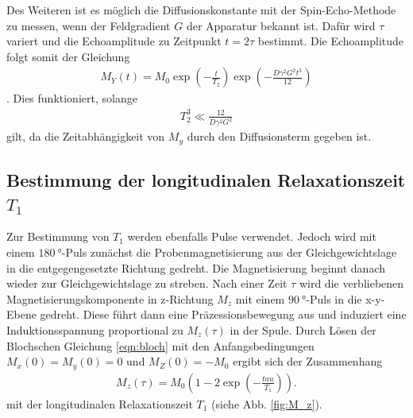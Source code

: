 Des Weiteren ist es möglich die
Diffusionskonstante mit der Spin-Echo-Methode
zu messen, wenn der Feldgradient $G$ der Apparatur bekannt ist.
Dafür wird $\tau$ variert und die Echoamplitude zu Zeitpunkt $t=2\tau$ bestimmt.
Die Echoamplitude folgt somit der Gleichung
\begin{align}
M_Y(t) = M_0\exp\left(-\frac{t}{T_2}\right)
\exp\left(-\frac{D\gamma^2 G^2 t^3}{12}\right) \label{eqn:32}
\end{align}.
Dies funktioniert, solange
\begin{align}
  T_2^3 \ll \frac{12}{D\gamma^2 G^2}
\end{align}
gilt, da die Zeitabhängigkeit von $M_y$ durch den Diffusionsterm gegeben ist.

\subsection{Bestimmung der longitudinalen Relaxationszeit $T_1$}
\label{subsec:t1}
Zur Bestimmung von $T_1$ werden ebenfalls Pulse verwendet.
Jedoch wird mit einem $\SI{180}{\degree}$-Puls zunächst die Probenmagnetisierung
aus der Gleichgewichtslage in die entgegengesetzte
Richtung gedreht. Die Magnetisierung beginnt danach
wieder zur Gleichgewichtslage zu streben.
Nach einer Zeit $\tau$ wird
die verbliebenen Magnetisierungskomponente in z-Richtung $M_z$
mit einem $\SI{90}{\degree}$-Puls in die x-y-Ebene gedreht.
Diese führt dann eine Präzessionsbewegung aus und induziert eine
Induktionsspannung proportional zu $M_z(\tau)$ in der Spule.
Durch Lösen der Blochschen Gleichung \eqref{eqn:bloch}
mit den Anfangsbedingungen $M_x(0)=M_y(0)=0$ und $M_Z(0)=-M_0$
ergibt sich der Zusammenhang
\begin{align}
  M_z(\tau) = M_0 \left(1 - 2 \exp\left(-\frac{tau}{T_1}\right)\right). \label{eqn:33}
\end{align}
mit der longitudinalen Relaxationszeit $T_1$ (siehe Abb. \ref{fig:M_z}).

